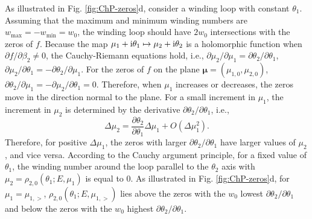 \documentclass[pdflatex,sn-nature, iicol]{sn-jnl}%
\theoremstyle{thmstyleone}%
\theoremstyle{thmstyletwo}%
\theoremstyle{thmstylethree}%
\begin{document}
As illustrated in Fig. \ref{fig:ChP-zeros}d, consider a winding loop
with constant $\theta_{1}$. Assuming that the maximum and minimum
winding numbers are $w_{\text{max}}=-w_{\text{min}}=w_{0}$, the winding
loop should have $2w_{0}$ intersections with the zeros of $f$. Because
the map $\mu_{1}+\mathrm{i}\theta_{1}\mapsto\mu_{2}+\mathrm{i}\theta_{2}$ is
a holomorphic function when $\partial f/\partial\beta_{2}\neq0$,
the Cauchy-Riemann equations hold, i.e., $\partial\mu_{2}/\partial\mu_{1}=\partial\theta_{2}/\partial\theta_{1}$,
$\partial\mu_{2}/\partial\theta_{1}=-\partial\theta_{2}/\partial\mu_{1}$.
For the zeros of $f$ on the plane $\boldsymbol{\mu}=(\mu_{1,0},\mu_{2,0})$,
$\partial\theta_{2}/\partial\mu_{1}=-\partial\mu_{2}/\partial\theta_{1}=0$.
Therefore, when $\mu_{1}$ increases or decreases, the zeros move
in the direction normal to the plane. For a small increment in $\mu_{1}$,
the increment in $\mu_{2}$ is determined by the derivative $\partial\theta_{2}/\partial\theta_{1}$,
i.e., 
\begin{equation}
\Delta\mu_{2}=\frac{\partial\theta_{2}}{\partial\theta_{1}}\Delta\mu_{1}+O\left(\Delta\mu_{1}^{2}\right).
\end{equation}
Therefore, for positive $\Delta\mu_{1}$, the zeros with larger $\partial\theta_{2}/\partial\theta_{1}$
have larger values of $\mu_{2}$, and vice versa. According to the
Cauchy argument principle, for a fixed value of $\theta_{1}$, the
winding number around the loop parallel to the $\theta_{2}$ axis
with $\mu_{2}=\rho_{2,0}(\theta_{1};E,\mu_{1})$ is equal to $0$.
As illustrated in Fig. \ref{fig:ChP-zeros}d, for $\mu_{1}=\mu_{1,>}$,
$\rho_{2,0}(\theta_{1};E,\mu_{1,>})$ lies above the zeros with the
$w_{0}$ lowest $\partial\theta_{2}/\partial\theta_{1}$ and below
the zeros with the $w_{0}$ highest $\partial\theta_{2}/\partial\theta_{1}$.
\end{document}
